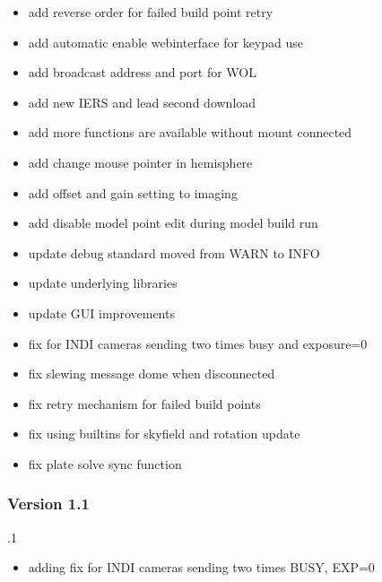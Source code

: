 \documentclass[a4paper,10pt,english]{sphinxmanual}
\begin{document}
\begin{itemize}
\item {} 
\sphinxAtStartPar
add reverse order for failed build point retry

\item {} 
\sphinxAtStartPar
add automatic enable webinterface for keypad use

\item {} 
\sphinxAtStartPar
add broadcast address and port for WOL

\item {} 
\sphinxAtStartPar
add new IERS and lead second download

\item {} 
\sphinxAtStartPar
add more functions are available without mount connected

\item {} 
\sphinxAtStartPar
add change mouse pointer in hemisphere

\item {} 
\sphinxAtStartPar
add offset and gain setting to imaging

\item {} 
\sphinxAtStartPar
add disable model point edit during model build run

\item {} 
\sphinxAtStartPar
update debug standard moved from WARN to INFO

\item {} 
\sphinxAtStartPar
update underlying libraries

\item {} 
\sphinxAtStartPar
update GUI improvements

\item {} 
\sphinxAtStartPar
fix for INDI cameras sending two times busy and exposure=0

\item {} 
\sphinxAtStartPar
fix slewing message dome when disconnected

\item {} 
\sphinxAtStartPar
fix retry mechanism for failed build points

\item {} 
\sphinxAtStartPar
fix using builtins for skyfield and rotation update

\item {} 
\sphinxAtStartPar
fix plate solve sync function

\end{itemize}


\subsubsection{Version 1.1}
\label{\detokenize{changelog/changelog:version-1-1}}
.1
\begin{itemize}
\item {} 
\sphinxAtStartPar
adding fix for INDI cameras sending two times BUSY, EXP=0

\end{itemize}
\end{document}
